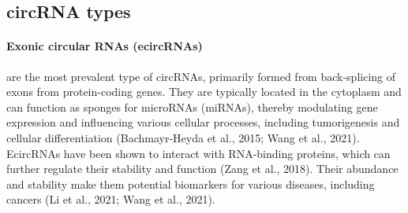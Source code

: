 \subsection{circRNA types}

\paragraph{Exonic circular RNAs (ecircRNAs)} are the most prevalent type of
circRNAs, primarily formed from back-splicing of exons from protein-coding genes. They are
typically located in the cytoplasm and can function as sponges for microRNAs
(miRNAs), thereby modulating gene expression and influencing various cellular
processes, including tumorigenesis and cellular differentiation (Bachmayr-Heyda
et al., 2015; Wang et al., 2021). EcircRNAs have been shown to interact with
RNA-binding proteins, which can further regulate their stability and function
(Zang et al., 2018). Their abundance and stability make them potential
biomarkers for various diseases, including cancers (Li et al., 2021; Wang et
al., 2021).

